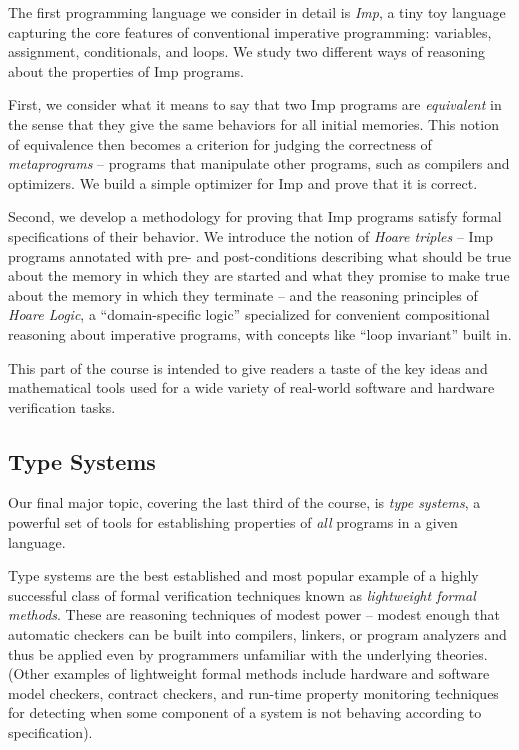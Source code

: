 \documentclass[12pt]{report}
\begin{document}
    The first programming language we consider in detail is \textit{Imp}, a
    tiny toy language capturing the core features of conventional
    imperative programming: variables, assignment, conditionals, and
    loops. We study two different ways of reasoning about the
    properties of Imp programs.


    First, we consider what it means to say that two Imp programs are
    \textit{equivalent} in the sense that they give the same behaviors for
    all initial memories.  This notion of equivalence then becomes a
    criterion for judging the correctness of \textit{metaprograms} --
    programs that manipulate other programs, such as compilers and
    optimizers.  We build a simple optimizer for Imp and prove that it
    is correct.


    Second, we develop a methodology for proving that Imp programs
    satisfy formal specifications of their behavior.  We introduce the
    notion of \textit{Hoare triples} -- Imp programs annotated with pre- and
    post-conditions describing what should be true about the memory in
    which they are started and what they promise to make true about
    the memory in which they terminate -- and the reasoning principles
    of \textit{Hoare Logic}, a ``domain-specific logic'' specialized for
    convenient compositional reasoning about imperative programs, with
    concepts like ``loop invariant'' built in.


    This part of the course is intended to give readers a taste of the
    key ideas and mathematical tools used for a wide variety of
    real-world software and hardware verification tasks.


\subsection{Type Systems}



 Our final major topic, covering the last third of the course, is
    \textit{type systems}, a powerful set of tools for establishing
    properties of \textit{all} programs in a given language.


    Type systems are the best established and most popular example of
    a highly successful class of formal verification techniques known
    as \textit{lightweight formal methods}.  These are reasoning techniques
    of modest power -- modest enough that automatic checkers can be
    built into compilers, linkers, or program analyzers and thus be
    applied even by programmers unfamiliar with the underlying
    theories.  (Other examples of lightweight formal methods include
    hardware and software model checkers, contract checkers, and
    run-time property monitoring techniques for detecting when some
    component of a system is not behaving according to specification).
\end{document}
